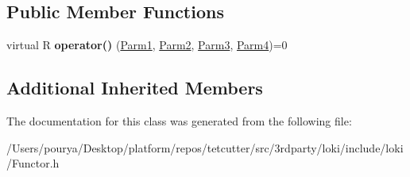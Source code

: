\subsection*{Public Member Functions}
\begin{DoxyCompactItemize}
\item 
\hypertarget{classLoki_1_1FunctorImpl_3_01R_00_01LOKI__TYPELIST__4_07P1_00_01P2_00_01P3_00_01P4_08_00_01ThreadingModel_01_4_a4c96032fd5c2a3cf4246b483c5f35c0c}{}virtual R {\bfseries operator()} (\hyperlink{classLoki_1_1EmptyType}{Parm1}, \hyperlink{classLoki_1_1EmptyType}{Parm2}, \hyperlink{classLoki_1_1EmptyType}{Parm3}, \hyperlink{classLoki_1_1EmptyType}{Parm4})=0\label{classLoki_1_1FunctorImpl_3_01R_00_01LOKI__TYPELIST__4_07P1_00_01P2_00_01P3_00_01P4_08_00_01ThreadingModel_01_4_a4c96032fd5c2a3cf4246b483c5f35c0c}

\end{DoxyCompactItemize}
\subsection*{Additional Inherited Members}


The documentation for this class was generated from the following file\+:\begin{DoxyCompactItemize}
\item 
/\+Users/pourya/\+Desktop/platform/repos/tetcutter/src/3rdparty/loki/include/loki/Functor.\+h\end{DoxyCompactItemize}
